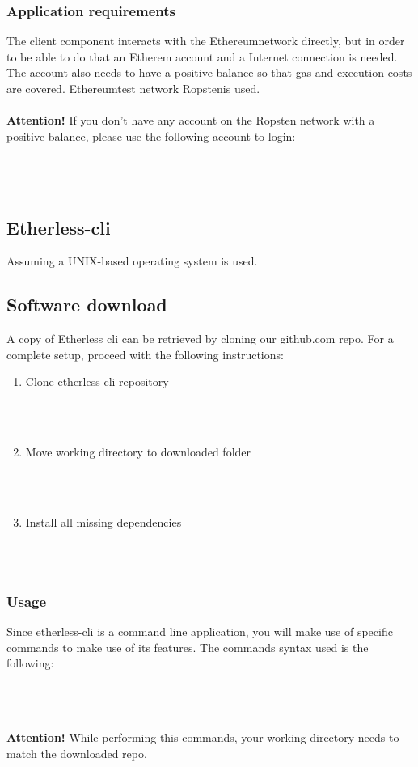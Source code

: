 \subsubsection{Application requirements}
The client component interacts with the Ethereum\glo network directly, but in order to be able to do that an Etherem account and a Internet connection is needed. The account also needs to have a positive balance so that gas and execution costs are covered. Ethereum\glo test network Ropsten\glo is used.\\\\
\textbf{Attention!} If you don't have any account on the Ropsten network with a positive balance, please use the following account to login:\\\\
	\\
	\\
\subsection{Etherless-cli}
Assuming a UNIX-based operating system is used.
\subsection{Software download}
A copy of Etherless cli can be retrieved by cloning our github.com repo. For a complete setup, proceed with the following instructions:
\begin{enumerate}
	\item Clone etherless-cli repository \\\\\centerline{}\\
	\item Move working directory to downloaded folder \\\\\centerline{}\\
	\item Install all missing dependencies \\\\\centerline{}\\
\end{enumerate}
\subsubsection{Usage}
Since etherless-cli is a command line application, you will make use of specific commands to make use of its features. The commands syntax used is the following:
\\\\\centerline{}\\\\
\textbf{Attention!} While performing this commands, your working directory needs to match the downloaded repo.\\

